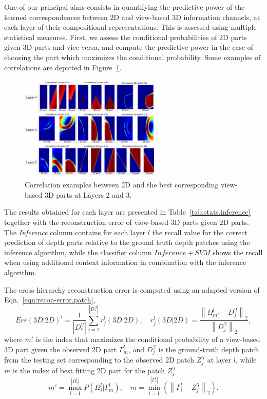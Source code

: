 \documentclass[runningheads]{llncs}
\begin{document}
One of our principal aims consists in quantifying the predictive power of the learned correspondences between 2D and view-based 3D information channels, at each layer of their compositional representations. This is assessed using multiple statistical measures. First, we assess the conditional probabilities of 2D parts given 3D parts and vice versa, and compute the predictive power in the case of choosing the part which maximizes the conditional probability. Some examples of correlations are depicted in Figure~\ref{correlations}.

\begin{figure}
\begin{center}
\includegraphics[width=0.6\textwidth]{correlations_1_3}
\end{center}
\caption{Correlation examples between 2D and the best corresponding view-based 3D parts at Layers 2 and 3.}
\label{correlations}
\end{figure}

The results obtained for each layer are presented in Table~\ref{tab:stats.inference} together with the reconstruction error of view-based 3D parts given 2D parts. The \textit{Inference} column contains for each layer $l$ the recall value for the correct prediction of depth parts relative to the ground truth depth patches using the inference algorithm, while the classifier column $Inference+SVM$ shows the recall when using additional context information in combination with the inference algorithm. 

The cross-hierarchy reconstruction error is computed using an adapted version of Eqn.~\ref{eqn:recon-error.patch},
\begin{equation}
 Err(3D|2D)^l = \frac{1}{|D_*^{'l}|} \sum_{j=1}^{|D_*^{'l}|} r_j^l(3D|2D),\quad
 r_j^l(3D|2D) = \frac{\left\|\Omega_{m'}^l-D_j^{'l}\right\|_2}{\left\|D_j^{'l}\right\|_2}, 
\end{equation}
 where $m'$ is the index that maximizes the conditional probability of a view-based 3D part given the observed 2D part $\Gamma_m^l$, and $D_j^{'l}$ is the ground-truth depth patch from the testing set corresponding to the observed 2D patch $Z_j^{'l}$ at layer $l$, while $m$ is the index of best fitting 2D part for the patch $Z_j^{'l}$
\begin{equation}
 m'=\max_{i=1}^{|\Omega_*^l|}P(\Omega_i^l|\Gamma_m^l),\quad  m=\min_{i=1}^{|\Gamma_*^l|}(\left\|\Gamma_i^l-Z_j^{'l}\right\|_2).
\end{equation}
\end{document}
